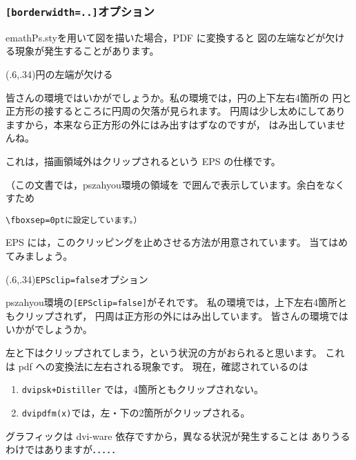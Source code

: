 \documentclass[a4j]{jarticle}
\begin{document}
\subsubsection{\texttt{[borderwidth=..]}オプション}
\textsf{emathPs.sty}を用いて図を描いた場合，PDF に変換すると
図の左端などが欠ける現象が発生することがあります。

\begin{showEx}(.6,.34){円の左端が欠ける}
\smallskip
{}
\smallskip
\end{showEx}

皆さんの環境ではいかがでしょうか。私の環境では，円の上下左右4箇所の
円と正方形の接するところに円周の欠落が見られます。
円周は少し太めにしてありますから，本来なら正方形の外にはみ出すはずなのですが，
はみ出していませんね。

これは，描画領域外はクリップされるという EPS の仕様です。

（この文書では，\textsf{pszahyou}環境の領域を
で囲んで表示しています。余白をなくすため
\begin{jquote}
\begin{verbatim}
\fboxsep=0ptに設定しています。）
\end{verbatim}
\end{jquote}

EPS には，このクリッピングを止めさせる方法が用意されています。
当てはめてみましょう。

\begin{showEx}(.6,.34){\texttt{EPSclip=false}オプション}
\smallskip
{}
\smallskip
\end{showEx}

\textsf{pszahyou}環境の\verb+[EPSclip=false]+がそれです。
私の環境では，上下左右4箇所ともクリップされず，
円周は正方形の外にはみ出しています。
皆さんの環境ではいかがでしょうか。

左と下はクリップされてしまう，という状況の方がおられると思います。
これは pdf への変換法に左右される現象です。
現在，確認されているのは
\begin{enumerate}[(1)]
  \item \verb/dvipsk+Distiller/ では，4箇所ともクリップされない。
  \item \verb/dvipdfm(x)/では，左・下の2箇所がクリップされる。
\end{enumerate}
グラフィックは dvi-ware 依存ですから，異なる状況が発生することは
ありうるわけではありますが．．．．．
\end{document}
